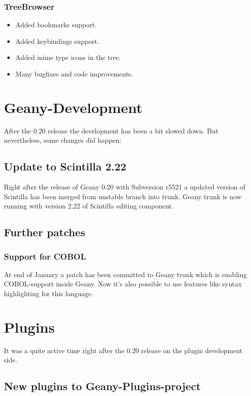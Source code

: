 \documentclass[%
paper=a4,%
fontsize=12pt,%
twoside=false,%
DIV18,
headsepline,
plainheadsepline,
footsepline,
plainfootsepline,
parskip=half,%
openany,%
]{scrartcl}
\begin{document}
\subsubsection{TreeBrowser}
\begin{itemize}
	\item Added bookmarks support.
	\item Added keybindings support.
	\item Added mime type icons in the tree.
	\item Many bugfixes and code improvements.
\end{itemize}

\section{Geany-Development}

After the 0.20 release the development has been a bit slowed down. But
nevertheless, some changes did happen:

\subsection{Update to Scintilla 2.22}

Right after the release of Geany 0.20 with Subversion r5521 a
updated version of Scintilla has been merged from unstable branch
into trunk. Geany trunk is now running with version 2.22 of
Scintilla editing component.

\subsection{Further patches}
\subsubsection{Support for COBOL}

At end of January a patch has been committed to Geany trunk which is
enabling COBOL-support inside Geany. Now it's also possible to use
features like syntax highlighting for this language.


\section{Plugins}

It was a quite active time right after the 0.20 release on the plugin
development side.

\subsection{New plugins to Geany-Plugins-project}
\end{document}
